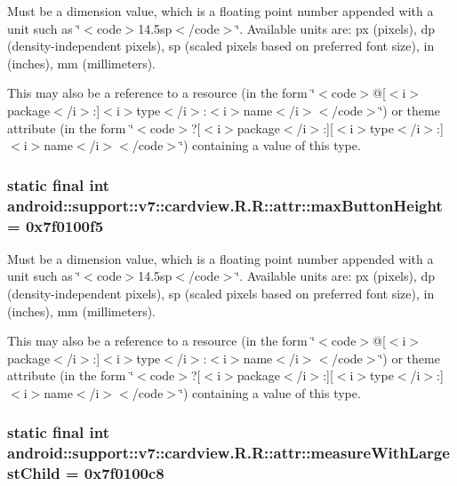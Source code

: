 Must be a dimension value, which is a floating point number appended with a unit such as \char`\"{}$<$code$>$14.5sp$<$/code$>$\char`\"{}. Available units are: px (pixels), dp (density-independent pixels), sp (scaled pixels based on preferred font size), in (inches), mm (millimeters). 

This may also be a reference to a resource (in the form \char`\"{}$<$code$>$@\mbox{[}$<$i$>$package$<$/i$>$:\mbox{]}$<$i$>$type$<$/i$>$:$<$i$>$name$<$/i$>$$<$/code$>$\char`\"{}) or theme attribute (in the form \char`\"{}$<$code$>$?\mbox{[}$<$i$>$package$<$/i$>$:\mbox{]}\mbox{[}$<$i$>$type$<$/i$>$:\mbox{]}$<$i$>$name$<$/i$>$$<$/code$>$\char`\"{}) containing a value of this type. \hypertarget{classandroid_1_1support_1_1v7_1_1cardview_1_1_r_1_1attr_470896082ba8fa7f73284b4773bbe6e7}{
\subsubsection[{maxButtonHeight}]{\setlength{\rightskip}{0pt plus 5cm}static final int android::support::v7::cardview.R.R::attr::maxButtonHeight = 0x7f0100f5}}
\label{classandroid_1_1support_1_1v7_1_1cardview_1_1_r_1_1attr_470896082ba8fa7f73284b4773bbe6e7}


Must be a dimension value, which is a floating point number appended with a unit such as \char`\"{}$<$code$>$14.5sp$<$/code$>$\char`\"{}. Available units are: px (pixels), dp (density-independent pixels), sp (scaled pixels based on preferred font size), in (inches), mm (millimeters). 

This may also be a reference to a resource (in the form \char`\"{}$<$code$>$@\mbox{[}$<$i$>$package$<$/i$>$:\mbox{]}$<$i$>$type$<$/i$>$:$<$i$>$name$<$/i$>$$<$/code$>$\char`\"{}) or theme attribute (in the form \char`\"{}$<$code$>$?\mbox{[}$<$i$>$package$<$/i$>$:\mbox{]}\mbox{[}$<$i$>$type$<$/i$>$:\mbox{]}$<$i$>$name$<$/i$>$$<$/code$>$\char`\"{}) containing a value of this type. \hypertarget{classandroid_1_1support_1_1v7_1_1cardview_1_1_r_1_1attr_91261c8906df5228943a8032a0daed07}{
\subsubsection[{measureWithLargestChild}]{\setlength{\rightskip}{0pt plus 5cm}static final int android::support::v7::cardview.R.R::attr::measureWithLargestChild = 0x7f0100c8}}
\label{classandroid_1_1support_1_1v7_1_1cardview_1_1_r_1_1attr_91261c8906df5228943a8032a0daed07}


